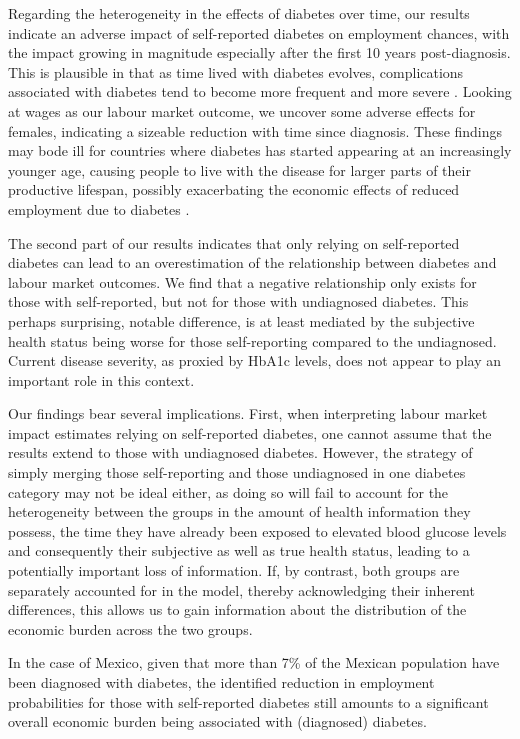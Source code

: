 Regarding the heterogeneity in the effects of diabetes over time, our results indicate an adverse impact of self-reported diabetes on employment chances, with the impact growing in magnitude especially after the first 10 years post-diagnosis. This is plausible in that as time lived with diabetes evolves, complications associated with diabetes tend to become more frequent and more severe \parencite{Adler2003}. Looking at wages as our labour market outcome, we uncover some adverse effects for females, indicating a sizeable reduction with time since diagnosis. These findings may bode ill for countries where diabetes has started appearing at an increasingly younger age, causing people to live with the disease for larger parts of their productive lifespan, possibly exacerbating the economic effects of reduced employment due to diabetes \parencite{Hu2011,Villalpando2010}.

The second part of our results indicates that only relying on self-reported diabetes can lead to an overestimation of the relationship between diabetes and labour market outcomes. We find that a negative relationship only exists for those with self-reported, but not for those with undiagnosed diabetes. This perhaps surprising, notable difference, is at least mediated by the subjective health status being worse for those self-reporting compared to the undiagnosed. Current disease severity, as proxied by \ac{HbA1c} levels, does not appear to play an important role in this context.

Our findings bear several implications. First, when interpreting labour market impact estimates relying on self-reported diabetes, one cannot assume that the results extend to those with undiagnosed diabetes. However, the strategy of simply merging those self-reporting and those undiagnosed in one diabetes category may not be ideal either, as doing so will fail to account for the heterogeneity between the groups in the amount of health information they possess, the time they have already been exposed to elevated blood glucose levels and consequently their subjective as well as true health status, leading to a potentially important loss of information. If, by contrast, both groups are separately accounted for in the model, thereby acknowledging their inherent differences, this allows us to gain information about the distribution of the economic burden across the two groups. 

In the case of Mexico, given that more than 7\% of the Mexican population have been diagnosed with diabetes, the identified reduction in employment probabilities for those with self-reported diabetes still amounts to a significant overall economic burden being associated with (diagnosed) diabetes.

